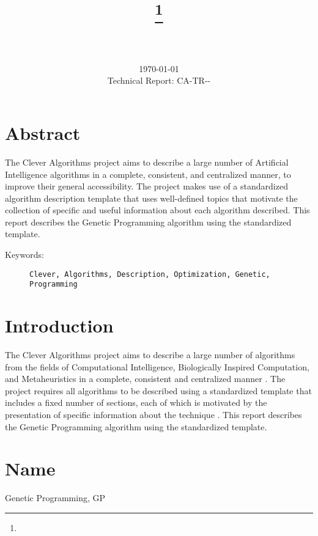 \documentclass[a4paper, 11pt]{article}
\title{{\myreporttitle}\footnote{\myreportlicense}}
\author{\myreportauthor\\{\myreportemail}\\\small\myreportproject}
\date{\today\\{\small{Technical Report: CA-TR-{\myreportdate}-\myreportversion}}}
\begin{document}
\maketitle

\section*{Abstract} 
The Clever Algorithms project aims to describe a large number of Artificial Intelligence algorithms in a complete, consistent, and centralized manner, to improve their general accessibility. 
The project makes use of a standardized algorithm description template that uses well-defined topics that motivate the collection of specific and useful information about each algorithm described.
This report describes the Genetic Programming algorithm using the standardized template.

\begin{description}
	\item[Keywords:] {\small\texttt{Clever, Algorithms, Description, Optimization, Genetic, Programming}}
\end{description} 

\section{Introduction} 
\label{sec:intro}
The Clever Algorithms project aims to describe a large number of algorithms from the fields of Computational Intelligence, Biologically Inspired Computation, and Metaheuristics in a complete, consistent and centralized manner \cite{Brownlee2010}.
The project requires all algorithms to be described using a standardized template that includes a fixed number of sections, each of which is motivated by the presentation of specific information about the technique \cite{Brownlee2010a}.
This report describes the Genetic Programming algorithm using the standardized template.

\section{Name} 
\label{sec:name}
Genetic Programming, GP
\end{document}
